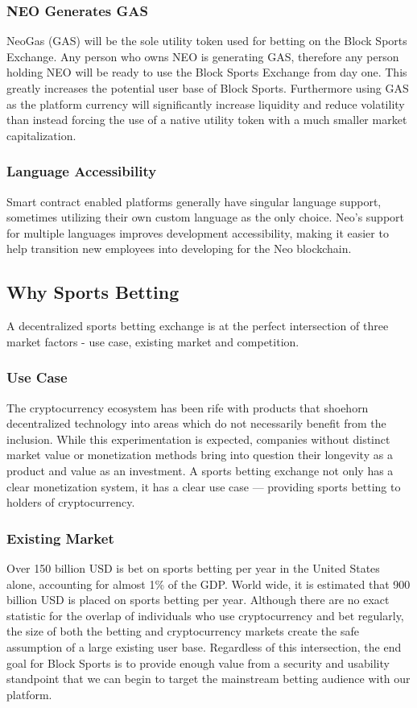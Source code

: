 \documentclass{article}
\begin{document}
		\subsubsection{NEO Generates GAS}
NeoGas (GAS) will be the sole utility token used for betting on the Block Sports Exchange. Any person who owns NEO is generating GAS, therefore any person holding NEO will be ready to use the Block Sports Exchange from day one. This greatly increases the potential user base of Block Sports. Furthermore using GAS as the platform currency will significantly increase liquidity and reduce volatility than instead forcing the use of a native utility token with a much smaller market capitalization.

		\subsubsection{Language Accessibility}
Smart contract enabled platforms generally have singular language support, sometimes utilizing their own custom language as the only choice. Neo’s support for multiple languages improves development accessibility, making it easier to help transition new employees into developing for the Neo blockchain.

	\subsection{Why Sports Betting}
A decentralized sports betting exchange is at the perfect intersection of three market factors - use case, existing market and competition. 

		\subsubsection{Use Case}
The cryptocurrency ecosystem has been rife with products that shoehorn decentralized technology into areas which do not necessarily benefit from the inclusion. While this experimentation is expected, companies without distinct market value or monetization methods bring into question their longevity as a product and value as an investment. A sports betting exchange not only has a clear monetization system, it has a clear use case --- providing sports betting to holders of cryptocurrency.

		
		\subsubsection{Existing Market}
Over 150 billion USD is bet on sports betting per year in the United States alone, accounting for almost 1\% of the GDP. World wide, it is estimated that 900 billion USD is placed on sports betting per year. Although there are no exact statistic for the overlap of individuals who use cryptocurrency and bet regularly, the size of both the betting and cryptocurrency markets create the safe assumption of a large existing user base. Regardless of this intersection, the end goal for Block Sports is to provide enough value from a security and usability standpoint that we can begin to target the mainstream betting audience with our platform. 
\end{document}

